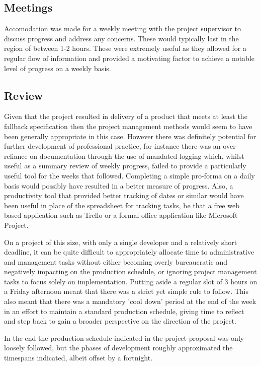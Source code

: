 \documentclass[twoside]{bhamthesis}
\begin{document}
\subsection{Meetings}
Accomodation was made for a weekly meeting with the project supervisor to discuss progress and address any concerns. These would typically last in the region of between 1-2 
hours. These were extremely useful as they allowed for a regular flow of information and provided a motivating factor to achieve a notable level of progress on a weekly basis.

\subsection{Review}
Given that the project resulted in delivery of a product that meets at least the fallback specification then the project management methods would seem to have been generally appropriate in this case. However there was definitely potential for further development of professional practice, for instance there was an over-reliance on documentation through the use of mandated logging which, whilst useful as a summary review of weekly progress, failed to provide a particularly useful tool for the weeks that followed. Completing a simple pro-forma on a daily basis would possibly have resulted in a better measure of progress. Also, a productivity tool that provided better tracking of dates or similar would have been useful in place of the spreadsheet for tracking tasks, be that a free web based application such as Trello or a formal office application like Microsoft Project.

On a project of this size, with only a single developer and a relatively short deadline, it can be quite difficult to appropriately allocate time to administrative and management tasks without either becoming overly bureaucratic and negatively impacting on the production schedule, or ignoring project management tasks to focus solely on implementation. Putting aside a regular slot of 3 hours on a Friday afternoon meant that there was a strict yet simple rule to follow. This also meant that there was a mandatory 'cool down' period at the end of the week in an effort to maintain a standard production schedule, giving time to reflect and step back to gain a broader perspective on the direction of the project.

In the end the production schedule indicated in the project proposal was only loosely followed, but the phases of development roughly approximated the timespans indicated, albeit offset  by a fortnight.
\end{document}
